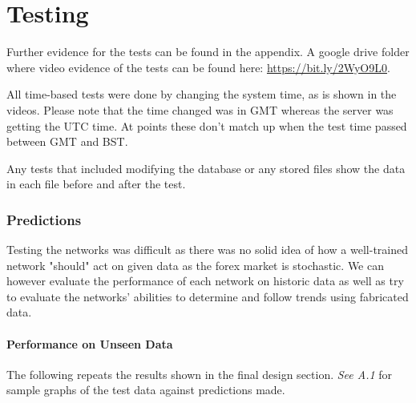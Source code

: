 \newpage

\part{Testing}  

    \graphicspath{{images/testing/}}

    Further evidence for the tests can be found in the appendix. A google drive folder where video evidence of the tests can be found here: \url{https://bit.ly/2WyO9L0}.

    All time-based tests were done by changing the system time, as is shown in the videos. Please note that the time changed was in GMT whereas the server was getting the UTC time. At points these don’t match up when the test time passed between GMT and BST.

    Any tests that included modifying the database or any stored files show the data in each file before and after the test.


    \section{Predictions}
        Testing the networks was difficult as there was no solid idea of how a well-trained network "should" act on given data as the forex market is stochastic. We can however evaluate the performance of each network on historic data as well as try to evaluate the networks' abilities to determine and follow trends using fabricated data.

        \subsection{Performance on Unseen Data}
        The following repeats the results shown in the final design section. \textit{See A.1} for sample graphs of the test data against predictions made.

